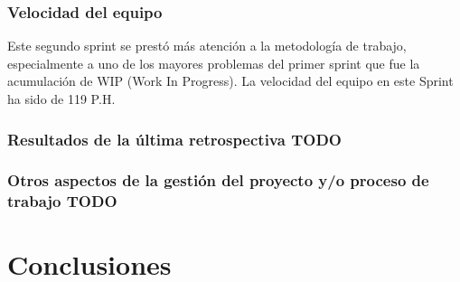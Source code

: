 \documentclass[11pt,a4paper]{report}
\begin{document}
\subsection{Velocidad del equipo}
Este segundo sprint se prestó más atención a la metodología de trabajo, especialmente a uno de los mayores problemas del primer sprint que fue la acumulación de WIP (Work In Progress). La velocidad del equipo en este Sprint ha sido de 119 P.H.
\subsection{Resultados de la última retrospectiva TODO}
\subsection{Otros aspectos de la gestión del proyecto y/o proceso de trabajo TODO}

\chapter{Conclusiones}
\end{document}
